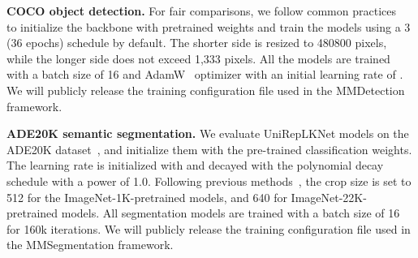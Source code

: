 \documentclass[10pt,twocolumn,letterpaper]{article}
\begin{document}
\noindent\textbf{COCO object detection.} For fair comparisons, we follow common practices~\cite{liu2021swin,liu2022convnet} to initialize the backbone with pretrained weights and train the models using a 3 (36 epochs) schedule by default. The shorter side is resized to 480800 pixels, while the longer side does not exceed 1,333 pixels. All the models are trained with a batch size of 16 and AdamW~\cite{loshchilov2017decoupled} optimizer with an initial learning rate of . We will publicly release the training configuration file used in the MMDetection framework.


\noindent\textbf{ADE20K semantic segmentation.} We evaluate UniRepLKNet models on the ADE20K dataset~\cite{zhou2017scene}, and initialize them with the pre-trained classification weights. The learning rate is initialized with  and decayed with the polynomial decay schedule with a power of 1.0. Following previous methods~\cite{liu2021swin,liu2022convnet}, the crop size is set to 512 for the ImageNet-1K-pretrained models, and 640 for ImageNet-22K-pretrained models. All segmentation models are trained with a batch size of 16 for 160k iterations. We will publicly release the training configuration file used in the MMSegmentation framework. 
\end{document}
